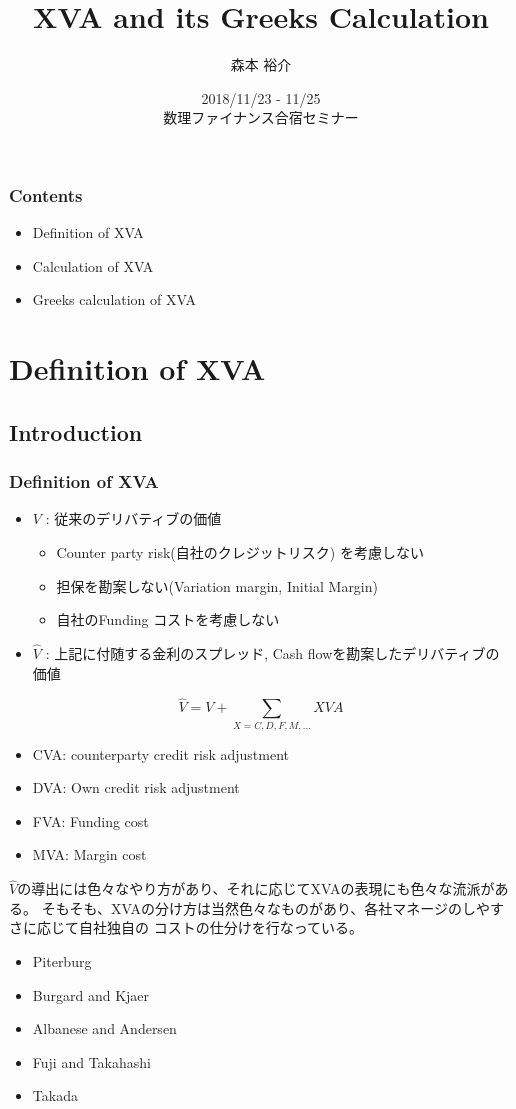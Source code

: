\documentclass[driverfallback=dvipdfmx,cjk]{beamer}
\title{XVA and its Greeks Calculation}
\author{森本 裕介}
\institute{三菱UFJ銀行}
\date{2018/11/23 - 11/25 \\ 数理ファイナンス合宿セミナー}
\begin{document}
\begin{frame}
\titlepage
\end{frame}

\begin{frame}\frametitle{Contents}
\begin{itemize}
    \item Definition of XVA
    \item Calculation of XVA
    \item Greeks calculation of XVA
\end{itemize}
\tableofcontents
\end{frame}

\section{Definition of XVA}
\subsection{Introduction}
\begin{frame} \frametitle{Definition of XVA}
    \begin{itemize}
        \item $V$ : 従来のデリバティブの価値
            \begin{itemize}
                \item Counter party risk(自社のクレジットリスク) を考慮しない
                \item 担保を勘案しない(Variation margin, Initial Margin)
                \item 自社のFunding コストを考慮しない
            \end{itemize}
        \item $\hat{V}$ : 上記に付随する金利のスプレッド, Cash flowを勘案したデリバティブの価値
    \end{itemize}
    $$\hat{V} = V + \sum_{X=C, D, F, M, ...} XVA$$
    \begin{itemize}
        \item CVA: counterparty credit risk adjustment
        \item DVA: Own credit risk adjustment
        \item FVA: Funding cost
        \item MVA: Margin cost
    \end{itemize}
\end{frame}

\begin{frame}
        $\hat{V}$の導出には色々なやり方があり、それに応じてXVAの表現にも色々な流派がある。
        そもそも、XVAの分け方は当然色々なものがあり、各社マネージのしやすさに応じて自社独自の
        コストの仕分けを行なっている。
        \begin{itemize}
            \item Piterburg
            \item Burgard and Kjaer
            \item Albanese and Andersen
            \item Fuji and Takahashi
            \item Takada
        \end{itemize}
\end{frame}
\end{document}
